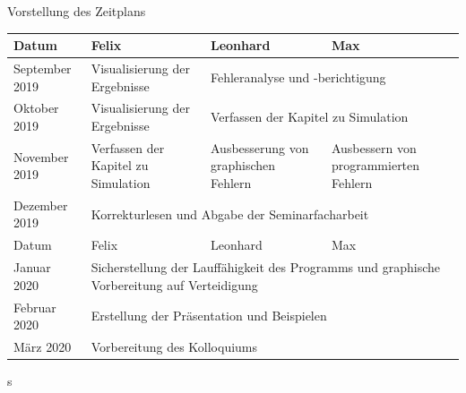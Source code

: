 \documentclass[11pt]{beamer}
\begin{document}
\begin{frame}{Vorstellung des Zeitplans}
\begin{footnotesize}
\begin{tabular}{|p{2cm}||p{2.5cm}|p{2.5cm}|p{2.5cm}|} \hline
   Datum & Felix & Leonhard & Max \\ \hline \hline
   September 2019 & Visualisierung der Ergebnisse & \multicolumn{2}{|p{5cm}|}{Fehleranalyse und -berichtigung} \\ \hline
   Oktober 2019 & Visualisierung der Ergebnisse & \multicolumn{2}{|p{5cm}|}{Verfassen der Kapitel zu Simulation} \\ \hline
   November 2019 & Verfassen der Kapitel zu Simulation & Ausbesserung von graphischen Fehlern & Ausbessern von programmierten Fehlern \\ \hline
   Dezember 2019 & \multicolumn{3}{|p{7.5cm}|}{Korrekturlesen und Abgabe der Seminarfacharbeit} \\ \hline
   Datum & Felix & Leonhard & Max \\ \hline \hline
    Januar 2020 & \multicolumn{3}{|p{7.5cm}|}{Sicherstellung der Lauffähigkeit des Programms und graphische Vorbereitung auf Verteidigung} \\ \hline
     Februar 2020 & \multicolumn{3}{|p{7.5cm}|}{Erstellung der Präsentation und Beispielen} \\ \hline
      März 2020 & \multicolumn{3}{|p{7.5cm}|}{Vorbereitung des Kolloquiums} \\ \hline
\end{tabular}
\end{footnotesize}
\end{frame}
s
\end{document}
